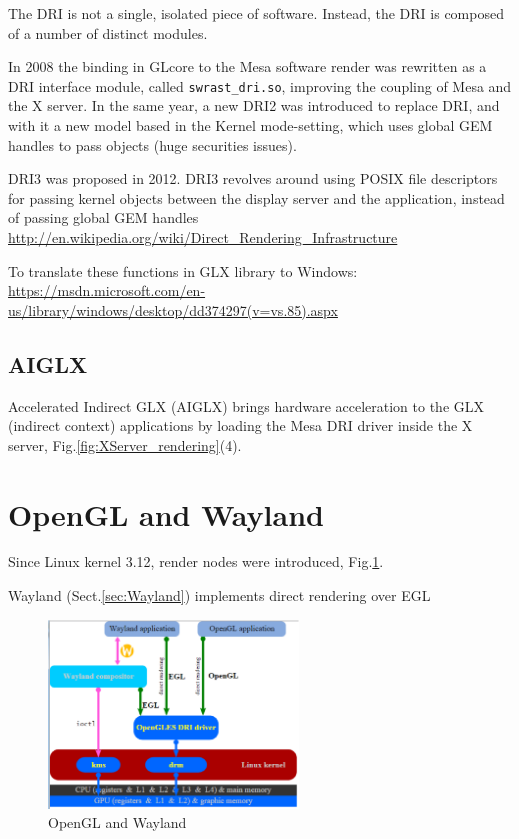 The DRI is not a single, isolated piece of software. Instead, the DRI is
composed of a number of distinct modules. 

In 2008 the binding in GLcore to the Mesa software render was rewritten as a DRI
interface module, called \verb!swrast_dri.so!, improving the coupling of Mesa
and the X server. In the same year, a new DRI2 was introduced to replace DRI,
and with it a new model based in the Kernel mode-setting, which uses 
global GEM handles to pass objects (huge securities issues).

DRI3 was proposed in 2012. DRI3 revolves around using POSIX file descriptors for
passing kernel objects between the display server and the application, instead
of passing global GEM handles
\url{http://en.wikipedia.org/wiki/Direct_Rendering_Infrastructure}

To translate these functions in GLX library to Windows: 
\url{https://msdn.microsoft.com/en-us/library/windows/desktop/dd374297(v=vs.85).aspx}

\subsection{AIGLX}
\label{sec:AIGLX}

Accelerated Indirect GLX (AIGLX) brings hardware acceleration to the GLX
(indirect context) applications by loading the Mesa DRI driver inside the X
server, Fig.\ref{fig:XServer_rendering}(4).

\section{OpenGL and Wayland}

Since Linux kernel 3.12, render nodes were introduced,
Fig.\ref{fig:OpenGL_Wayland}.

Wayland (Sect.\ref{sec:Wayland}) implements direct rendering over EGL

\begin{figure}[hbt]
  \centerline{\includegraphics[height=5cm,
    angle=0]{./images/OpenGL_Wayland.eps}}
\caption{OpenGL and Wayland}
\label{fig:OpenGL_Wayland}
\end{figure}



